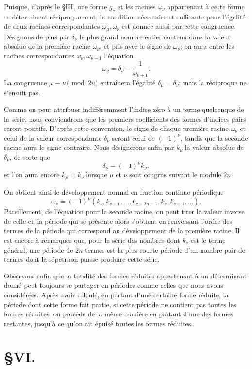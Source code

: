 \documentclass[11pt]{article}
\begin{document}
Puisque, d'après le \S III, une forme $g_\nu$ et les racines $\omega_\nu$ appartenant à cette forme se déterminent réciproquement, la condition nécessaire et suffisante pour l'égalité de deux racines correspondantes $\omega_\mu,\omega_\nu$ est donnée aussi par cette congruence. Désignons de plus par $\delta_\nu$ le plus grand nombre entier contenu dans la valeur absolue de la première racine $\omega_\nu$, et pris avec le signe de $\omega_\nu$; on aura entre les racines correspondantes $\omega_\nu,\omega_{\nu+1}$ l'équation
\[
  \omega_\nu=\delta_\nu-\frac1{\omega_{\nu+1}}.
\]
La congruence $\mu\equiv\nu\pmod{2n}$ entraînera l'égalité $\delta_\mu=\delta_\nu$; mais la réciproque ne s'ensuit pas.

Comme on peut attribuer indifféremment l'indice zéro à un terme quelconque de la série, nous conviendrons que les premiers coefficients des formes d'indices pairs seront positifs. D'après cette convention, le signe de chaque première racine $\omega_\nu$ et celui de la valeur correspondante $\delta_\nu$ seront celui de $(-1)^\nu$, tandis que la seconde racine aura le signe contraire. Nous désignerons enfin par $k_\nu$ la valeur absolue de $\delta_\nu$, de sorte que
\[
  \delta_\nu=(-1)^\nu k_\nu,
\]
et l'on aura encore $k_\mu=k_\nu$ lorsque $\mu$ et $\nu$ sont congrus suivant le module $2n$.

On obtient ainsi le développement normal en fraction continue périodique
\[
  \omega_\nu=(-1)^\nu(k_\nu,k_{\nu+1},\ldots,k_{\nu+2n-1},k_\nu,k_{\nu+1},\ldots).
\]
Pareillement, de l'équation pour la seconde racine, on peut tirer la valeur inverse de celle-ci; la période qui se présente alors s'obtient en renversant l'ordre des termes de la période qui correspond au développement de la première racine. Il est encore à remarquer que, pour la série des nombres dont $k_\nu$ est le terme général, une période de $2n$ termes est la plus courte période d'un nombre pair de termes dont la répétition puisse produire cette série.

Observons enfin que la totalité des formes réduites appartenant à un déterminant donné peut toujours se partager en périodes comme celles que nous avons considérées. Après avoir calculé, en partant d'une certaine forme réduite, la période dont cette forme fait partie, si cette période ne contient pas toutes les formes réduites, on procède de la même manière en partant d'une des formes restantes, jusqu'à ce qu'on ait épuisé toutes les formes réduites.

\section*{\S VI.}
\end{document}
